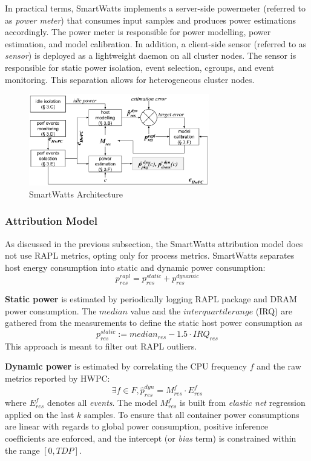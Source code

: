 In practical terms, SmartWatts implements a server-side powermeter (referred to as \textit{power meter}) that consumes input samples and produces power estimations accordingly. The power meter is responsible for power modelling, power estimation, and model calibration. In addition, a client-side sensor (referred to as \textit{sensor}) is deployed as a lightweight daemon on all cluster nodes. The sensor is responsible for static power isolation, event selection, cgroups, and event monitoring. This separation allows for heterogeneous cluster nodes.

\begin{figure}[ht]
    \centering
    \includegraphics[width=0.7\textwidth]{Figures/smartwatts_architecture.png}
    \caption[SmartWatts architecture]{SmartWatts Architecture}
    \label{fig:smartwatts_architecture}
\end{figure}

\subsubsection{Attribution Model}
\label{sec:smartwatts-attribution}
As discussed in the previous subsection, the SmartWatts attribution model does not use RAPL metrics, opting only for process metrics. SmartWatts separates host energy consumption into static and dynamic power consumption:
\begin{equation}
    p_{res}^{rapl} = p_{res}^{static} + p_{res}^{dynamic}
\end{equation}

\textbf{Static power} is estimated by periodically logging RAPL package and DRAM power consumption. The $median$ value and the $interquartile range$ (IRQ) are gathered from the measurements to define the static host power consumption as 
\begin{equation}
    p_{res}^{static} := median_{res} - 1.5 \cdot IRQ_{res}
\end{equation}
This approach is meant to filter out RAPL outliers.

\textbf{Dynamic power} is estimated by correlating the CPU frequency $f$ and the raw metrics reported by HWPC:
\begin{equation}
    \exists f \in F, \hat{p}_{res}^{dyn} = M_{res}^{f} \cdot E_{res}^{f}
\end{equation}
where $E_{res}^{f}$ denotes all \textit{events}. The model $M_{res}^{f}$ is built from \textit{elastic net} regression applied on the last $k$ samples. To ensure that all container power consumptions are linear with regards to global power consumption, positive inference coefficients are enforced, and the intercept (or \textit{bias} term) is constrained within the range $[0, TDP]$.

